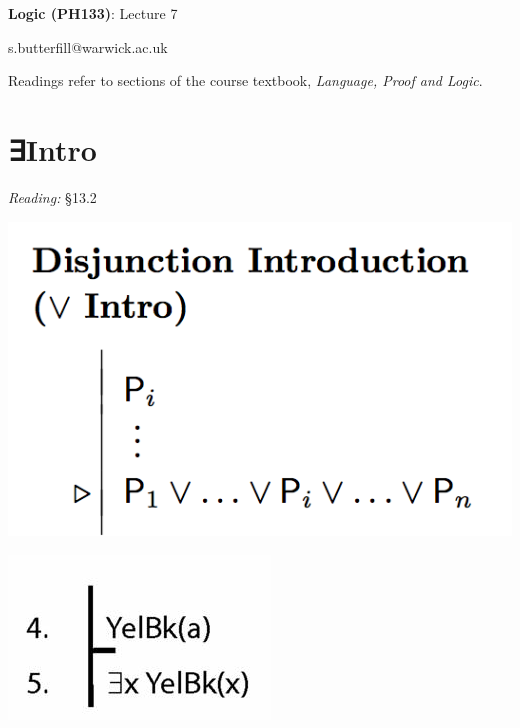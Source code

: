 \documentclass[12pt]{extarticle}
\date{}
\makeatletter
\def \ititle {Origins of Mind}
\def \isubtitle {Lecture 08}
\def \iemail{s.butterfill@warwick.ac.uk}
\makeatother
\begin{document}

\begin{multicols*}{3}

\setlength\footnotesep{1em}







\def \ititle {Logic (PH133)}
 
\def \isubtitle {Lecture 7}
 
\begin{center}
 
{\Large
 
\textbf{\ititle}: \isubtitle
 
}
 
 
 
\iemail %
 
\end{center}
 
Readings refer to sections of the course textbook, \emph{Language, Proof and Logic}.
 
 

 
 
\section{∃Intro}
 
\emph{Reading:} §13.2
 
\begin{center}
\includegraphics[scale=0.3]{img/rule_disjunction_intro.png}
\end{center}
\begin{center}
\includegraphics[scale=0.3]{img/unit_801_proof.png}
\end{center}
 

\end{multicols*}
\end{document}
